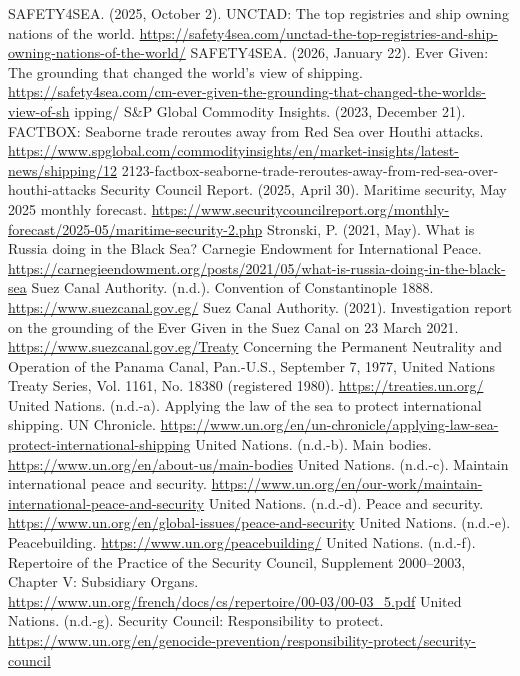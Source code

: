 \begin{referencelist}
   SAFETY4SEA. (2025, October 2). UNCTAD: The top registries and ship owning nations of the world. \url{https://safety4sea.com/unctad-the-top-registries-and-ship-owning-nations-of-the-world/}
   SAFETY4SEA. (2026, January 22). Ever Given: The grounding that changed the world's view of shipping. \url{https://safety4sea.com/cm-ever-given-the-grounding-that-changed-the-worlds-view-of-sh} ipping/
   S\&P Global Commodity Insights. (2023, December 21). FACTBOX: Seaborne trade reroutes away from Red Sea over Houthi attacks. \url{https://www.spglobal.com/commodityinsights/en/market-insights/latest-news/shipping/12} 2123-factbox-seaborne-trade-reroutes-away-from-red-sea-over-houthi-attacks
   Security Council Report. (2025, April 30). Maritime security, May 2025 monthly forecast. \url{https://www.securitycouncilreport.org/monthly-forecast/2025-05/maritime-security-2.php}
   Stronski, P. (2021, May). What is Russia doing in the Black Sea? Carnegie Endowment for International Peace. \url{https://carnegieendowment.org/posts/2021/05/what-is-russia-doing-in-the-black-sea}
   Suez Canal Authority. (n.d.). Convention of Constantinople 1888. \url{https://www.suezcanal.gov.eg/}
   Suez Canal Authority. (2021). Investigation report on the grounding of the Ever Given in the Suez Canal on 23 March 2021. \url{https://www.suezcanal.gov.eg/Treaty} Concerning the Permanent Neutrality and Operation of the Panama Canal, Pan.-U.S., September 7, 1977, United Nations Treaty Series, Vol. 1161, No. 18380 (registered 1980). \url{https://treaties.un.org/}
   United Nations. (n.d.-a). Applying the law of the sea to protect international shipping. UN Chronicle. \url{https://www.un.org/en/un-chronicle/applying-law-sea-protect-international-shipping}
   United Nations. (n.d.-b). Main bodies. \url{https://www.un.org/en/about-us/main-bodies}
   United Nations. (n.d.-c). Maintain international peace and security. \url{https://www.un.org/en/our-work/maintain-international-peace-and-security}
   United Nations. (n.d.-d). Peace and security. \url{https://www.un.org/en/global-issues/peace-and-security}
   United Nations. (n.d.-e). Peacebuilding. \url{https://www.un.org/peacebuilding/}
   United Nations. (n.d.-f). Repertoire of the Practice of the Security Council, Supplement 2000–2003, Chapter V: Subsidiary Organs. \url{https://www.un.org/french/docs/cs/repertoire/00-03/00-03_5.pdf}
   United Nations. (n.d.-g). Security Council: Responsibility to protect. \url{https://www.un.org/en/genocide-prevention/responsibility-protect/security-council}

\end{referencelist}
